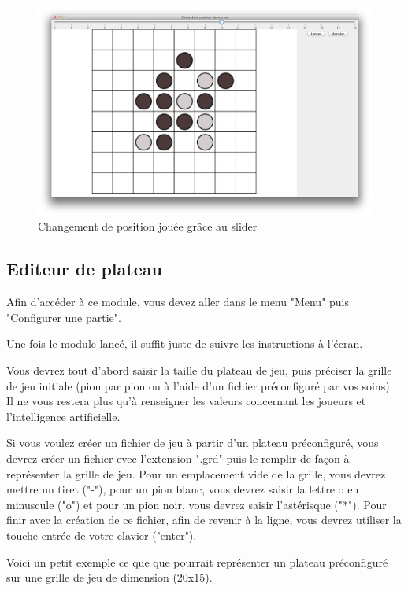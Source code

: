 \documentclass[a4paper,12pt]{report}
\begin{document}
\begin{figure}[H]
\centering
\includegraphics[scale=0.3]{Images/sliderevenir.png}
\caption{Changement de position jouée grâce au slider}
\label{cap5}
\end{figure}


\subsection{Editeur de plateau}

Afin d'accéder à ce module, vous devez aller dans le menu "Menu" puis "Configurer une partie".

Une fois le module lancé, il suffit juste de suivre les instructions à l'écran.

Vous devrez tout d'abord saisir la taille du plateau de jeu, puis préciser la grille de jeu initiale (pion par pion ou à l'aide d'un fichier préconfiguré par vos soins). Il ne vous restera plus qu'à renseigner les valeurs concernant les joueurs et l'intelligence artificielle.

Si vous voulez créer un fichier de jeu à partir d'un plateau préconfiguré, vous devrez créer un fichier evec l'extension ".grd" puis le remplir de façon à représenter la grille de jeu. Pour un emplacement vide de la grille, vous devrez mettre un tiret ("-"), pour un pion blanc, vous devrez saisir la lettre o en minuscule ("o") et pour un pion noir, vous devrez saisir l'astérisque ("*"). Pour finir avec la création de ce fichier, afin de revenir à la ligne, vous devrez utiliser la touche entrée de votre clavier ("enter").

Voici un petit exemple ce que que pourrait représenter un plateau préconfiguré sur une grille de jeu de dimension (20x15).
\end{document}
